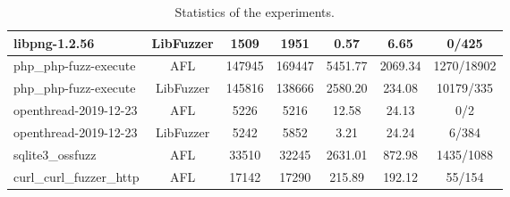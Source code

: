 \begin{table}[!t]
\begin{adjustbox}{angle=90}
{\begin{tabular}{|l|c|c|c|c|c|c|}
        \hline
        libpng-1.2.56            & LibFuzzer & 1509                                                           & 1951                                                           & 0.57                                                 & 6.65                                                 & 0/425                                                             \\[2ex]
        \hline
        php\_php-fuzz-execute    & AFL       & 147945                                                         & 169447                                                         & 5451.77                                              & 2069.34                                              & 1270/18902                                                        \\[2ex]
        \hline
        php\_php-fuzz-execute    & LibFuzzer & 145816                                                         & 138666                                                         & 2580.20                                              & 234.08                                               & 10179/335                                                         \\[2ex] 
        \hline
        openthread-2019-12-23    & AFL       & 5226                                                           & 5216                                                           & 12.58                                                & 24.13                                                & 0/2                                                               \\[2ex]
        \hline
        openthread-2019-12-23    & LibFuzzer & 5242                                                           & 5852                                                           & 3.21                                                 & 24.24                                                & 6/384                                                             \\[2ex]
        \hline
        sqlite3\_ossfuzz         & AFL       & 33510                                                          & 32245                                                          & 2631.01                                              & 872.98                                               & 1435/1088                                                         \\[2ex]
        \hline
        curl\_curl\_fuzzer\_http & AFL       & 17142                                                          & 17290                                                          & 215.89                                               & 192.12                                               & 55/154                                                            \\[2ex]
        \hline
        \end{tabular}}
    \end{adjustbox}
    \caption{Statistics of the experiments.}
    \label{table:all}
\end{table}

